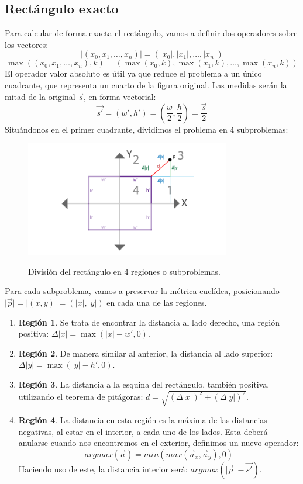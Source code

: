 \subsection{Rectángulo exacto}
Para calcular de forma exacta el rectángulo, vamos a definir dos operadores sobre los vectores:
\[\vert(x_0,x_1,\dots,x_n)\vert=(\vert x_0\vert,\vert x_1\vert,\dots,\vert x_n \vert)\]
\[\max\left((x_0,x_1,\dots,x_n), k\right)=(\max( x_0, k), \max(x_1, k),\dots, \max(x_n, k))\]
El operador valor absoluto es útil ya que reduce el problema a un único cuadrante, que representa un cuarto de la figura original. Las medidas serán la mitad de la original \(\Vec{s}\), en forma vectorial:
\[\Vec{s'}=(w', h')=\left(\dfrac{w}{2},\dfrac{h}{2}\right)=\dfrac{\Vec{s}}{2}\]
Situándonos en el primer cuadrante, dividimos el problema en 4 subproblemas:
\begin{figure}[H]
  \centering
  \captionsetup{justification=centering}%
  \includegraphics[width=0.8\textwidth]{secciones/imagenes/sdf/proofs/proof_rectangle.png}\label{fig:subproblem}
  \caption{División del rectángulo en 4 regiones o subproblemas.}
\end{figure}
Para cada subproblema, vamos a preservar la métrica euclídea, posicionando \(\vert\Vec{p}\vert=\vert(x,y)\vert=(\vert x\vert, \vert y \vert)\) en cada una de las regiones.
\begin{enumerate}
    \item \textbf{Región 1}. Se trata de encontrar la distancia al lado derecho, una región positiva: \(\Delta \vert x\vert=\max(\vert x\vert-w', 0)\).
    \item \textbf{Región 2}. De manera similar al anterior, la distancia al lado superior: \(\Delta\vert y\vert=\max(\vert y\vert-h', 0)\).
    \item \textbf{Región 3}. La distancia a la esquina del rectángulo, también positiva, utilizando el teorema de pitágoras: \(d = \sqrt{\left(\Delta \vert x\vert\right)^2+\left(\Delta \vert y\vert\right)^2}\).
    \item \textbf{Región 4}. La distancia en esta región es la máxima de las distancias negativas, al estar en el interior, a cada uno de los lados. Esta deberá anularse cuando nos encontremos en el exterior, definimos un nuevo operador:
    \[argmax(\Vec{a})=min(max(\Vec{a}_x, \Vec{a}_y), 0)\]
    Haciendo uso de este, la distancia interior será: \(argmax(\vert\Vec{p}\vert-\Vec{s'})\).
\end{enumerate}
